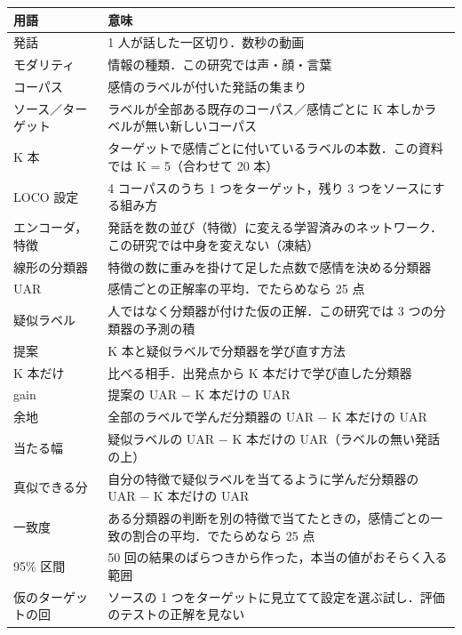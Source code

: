 \documentclass[a4paper,11pt]{ltjsarticle}
\begin{document}
\begin{center}
\small
\begin{tabular}{>{\raggedright}p{3.2cm}p{11.1cm}}
\toprule
用語 & 意味 \\
\midrule
発話 & 1 人が話した一区切り．数秒の動画 \\
モダリティ & 情報の種類．この研究では声・顔・言葉 \\
コーパス & 感情のラベルが付いた発話の集まり \\
ソース／ターゲット & ラベルが全部ある既存のコーパス／感情ごとに K 本しかラベルが無い新しいコーパス \\
K 本 & ターゲットで感情ごとに付いているラベルの本数．この資料では K = 5（合わせて 20 本） \\
LOCO 設定 & 4 コーパスのうち 1 つをターゲット，残り 3 つをソースにする組み方 \\
エンコーダ，特徴 & 発話を数の並び（特徴）に変える学習済みのネットワーク．この研究では中身を変えない（凍結） \\
線形の分類器 & 特徴の数に重みを掛けて足した点数で感情を決める分類器 \\
UAR & 感情ごとの正解率の平均．でたらめなら 25 点 \\
疑似ラベル & 人ではなく分類器が付けた仮の正解．この研究では 3 つの分類器の予測の積 \\
提案 & K 本と疑似ラベルで分類器を学び直す方法 \\
K 本だけ & 比べる相手．出発点から K 本だけで学び直した分類器 \\
gain & 提案の UAR − K 本だけの UAR \\
余地 & 全部のラベルで学んだ分類器の UAR − K 本だけの UAR \\
当たる幅 & 疑似ラベルの UAR − K 本だけの UAR（ラベルの無い発話の上） \\
真似できる分 & 自分の特徴で疑似ラベルを当てるように学んだ分類器の UAR − K 本だけの UAR \\
一致度 & ある分類器の判断を別の特徴で当てたときの，感情ごとの一致の割合の平均．でたらめなら 25 点 \\
95\% 区間 & 50 回の結果のばらつきから作った，本当の値がおそらく入る範囲 \\
仮のターゲットの回 & ソースの 1 つをターゲットに見立てて設定を選ぶ試し．評価のテストの正解を見ない \\
\bottomrule
\end{tabular}
\end{center}
\end{document}
